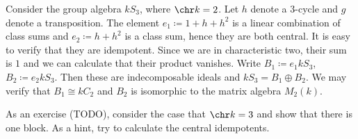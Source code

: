 Consider the group algebra $kS_3$, where $\chr k = 2$. Let $h$ denote
a $3$-cycle and $g$ denote a transposition. The element
$e_1\coloneqq1 + h + h^2$ is a linear combination of class sums and $e_2\coloneqq h + h^2$
is a class sum, hence they are both central. It is easy to verify that they are
idempotent.
Since we are in characteristic two, their sum is $1$ and we can calculate
that their product vanishes. Write $B_1\coloneqq e_1kS_3$, $B_2\coloneqq e_2kS_3$.
Then these are indecomposable ideals and $kS_3 = B_1\oplus B_2$. We may verify
that $B_1\cong kC_2$ and $B_2$ is isomorphic to the matrix algebra $M_2(k)$.

As an exercise (TODO), consider the case that $\chr k = 3$ and show that there is
one block. As a hint, try to calculate the central idempotents.
